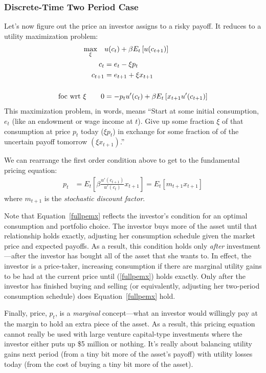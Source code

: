 \documentclass[a4paper,12pt]{scrartcl}
\begin{document}
\subsubsection{Discrete-Time Two Period Case}

Let's now figure out the price an investor assigns to a risky
payoff.  It reduces to a utility maximization problem:
\begin{align}
    \max_{\xi} \quad &u(c_t) + \beta E_t\left[u(c_{t+1})\right]
    \label{foc}\\
    c_t &= e_t - \xi p_t  \notag\\
    c_{t+1} &= e_{t+1} + \xi x_{t+1} \notag\\\notag\\
    \text{foc wrt $\xi$} \qquad
    0 &= -p_t u'(c_t) + \beta E_t\left[ x_{t+1} u'(c_{t+1})\right]
    \notag
\end{align}
This maximization problem, in words, means ``Start at some initial
consumption, $e_t$ (like an endowment or wage income at $t$). Give up
some fraction $\xi$ of that consumption at price $p_t$ today ($\xi p_t$)
in exchange for some fraction of of the uncertain payoff tomorrow $(\xi
x_{t+1})$.''

We can rearrange the first order condition above to get to the
fundamental pricing equation:
\begin{align}
    p_t &= E_t\left[
	\beta\frac{u'(c_{t+1})}{u'(c_{t})} x_{t+1} \right]
    = E_t\left[ m_{t+1} x_{t+1} \right]
	\label{fullpemx}
\end{align}
where $m_{t+1}$ is the \emph{stochastic discount factor}.

Note that Equation~\ref{fullpemx} reflects the investor's condition for
an optimal consumption and portfolio choice. The investor buys more of
the asset until that relationship holds exactly, adjusting her
consumption schedule given the market price and expected payoffs. As a
result, this condition holds only \emph{after} investment---after the
investor has bought all of the asset that she wants to. In effect, the
investor is a price-taker, increasing consumption if there are marginal
utility gains to be had at the current price until (\ref{fullpemx})
holds exactly.  Only after the investor has finished buying and selling
(or equivalently, adjusting her two-period consumption schedule) does
Equation~\ref{fullpemx} hold.

Finally, price, $p_t$, is a \emph{marginal} concept---what an investor
would willingly pay at the margin to hold an extra piece of the asset.
As a result, this pricing equation cannot really be used with large
venture capital-type investments where the investor either puts up \$5
million or nothing. It's really about balancing utility gains next
period (from a tiny bit more of the asset's payoff) with utility losses
today (from the cost of buying a tiny bit more of the asset).
\end{document}
